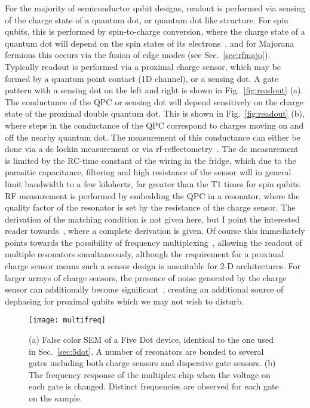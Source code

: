 For the majority of semiconductor qubit designs, readout is performed via sensing of the charge state of a quantum dot, or quantum dot like
structure. For spin qubits, this is performed by spin-to-charge conversion, where the charge state of a quantum dot will depend on the spin states
of its electrons~\cite{nature02693,PhysRevB.98.125404}, and for Majorana fermions this occurs via the fusion of edge modes (see Sec.~\ref{sec:rfmajo}).
Typically readout is performed via a proximal charge sensor, which may be formed by a quantum point contact (1D channel), or a sensing dot. A gate pattern
with a sensing dot on the left and right is shown in Fig.~\ref{fig:readout} (a). The conductance of the QPC or sensing dot will depend sensitively
on the charge state of the proximal double quantum dot. This is shown in Fig.~\ref{fig:readout} (b), where steps in the conductance of the QPC correspond to
charges moving on and off the nearby quantum dot. The measurement of this conductance can either be done via a dc lockin measurement or via
rf-reflectometry~\cite{Reilly:2007ig}. The dc measurement is limited by the RC-time constant of the wiring in the fridge, which due to the parasitic
capacitance, filtering and high resistance of the sensor will in general limit bandwidth to a few kilohertz, far greater than the T1 times for spin qubits.
RF measurement is performed by embedding the QPC in a resonator, where the quality factor of the resonator is set by the resistance of the charge sensor.
The derivation of the matching condition is not given here, but I point the interested reader towards~\cite{crootthesis}, where a complete derivation is given.
Of course this immediately points towards the possibility of frequency multiplexing~\cite{doi:10.1063/1.4868107}, allowing the readout of multiple
resonators simultaneously, although the requirement for a proximal charge sensor means such a sensor design is unsuitable for 2-D architectures. For larger
arrays of charge sensors, the presence of noise generated by the charge sensor can additionally become significant~\cite{PhysRevB.78.035324}, creating
an additional source of dephasing for proximal qubits which we may not wish to disturb.

\begin{figure}
  \texttt{[image: multifreq]}
  \caption[Frequency multiplexed readout of a five-dot device]
  {\label{fig:multifreq}(a) False color SEM of a Five Dot device, identical to the one used in Sec.~\ref{sec:5dot}. A number of resonators are bonded to several gates
  including both charge sensors and dispersive gate sensors. (b) The frequency response of the multiplex chip when the voltage on each gate is changed. Distinct frequencies
  are observed for each gate on the sample.}
\end{figure}

